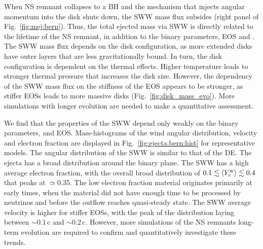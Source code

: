 When \ac{NS} remnant collapses to a \ac{BH} and the mechanism that injects angular 
momentum into the disk shuts down, the \ac{SWW} mass flux subsides (right panel of  Fig.~\ref{fig:mej:bern}). 
Thus, the total ejected mass via \ac{SWW} is directly related to the lifetime of the 
\ac{NS} remnant, in addition to the binary parameters, \ac{EOS} and \mr{}.
%
The \ac{SWW} mass flux depends on the disk configuration, as more extended disks 
have outer layers that are less gravitationally bound. In turn, the disk 
configuration is dependent on the thermal effects. Higher temperature leads to 
stronger thermal pressure that increases the disk size. 
However, the dependency of the \ac{SWW} mass flux on the stiffness of the \ac{EOS} 
appears to be stronger, as stiffer \acp{EOS} leads to more massive disks  %
(Fig.~\ref{fig:disk_mass_evo}). More simulations with longer \pmerg{} evolution are needed 
to make a quantitative assessment. 

We find that the properties of the \ac{SWW} depend only weakly on the binary parameters,
\mr{} and \ac{EOS}. Mass-histograms of the wind angular distribution, velocity and 
electron fraction are displayed in Fig.~\ref{fig:ejecta:bern:hist} for representative models. 
The angular distribution of the \ac{SWW} is similar to that of the \ac{DE}. The ejecta 
has a broad distribution around the binary plane.
The \ac{SWW} has a high average electron fraction, with the overall 
broad distribution of $0.1\lesssim \langle Y^{\text{w}}_{e}\rangle\lesssim0.4$ that peaks at ${\simeq}0.35$.
The low electron fraction material originates primarily at early times, when the 
material did not have enough time to be processed by neutrinos and before the 
outflow reaches quasi-steady state.
The \ac{SWW} average velocity is higher for stiffer \acp{EOS}, with the peak 
of the distribution laying between ${\sim}0.1\,$c and ${\sim}0.2\,$c.
However, more simulations of the \ac{NS} remnants long-term evolution are 
required to confirm and quantitatively investigate these trends.



